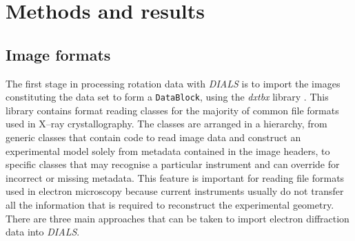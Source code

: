 \documentclass[preprint]{iucr}
\newcommand{\dxtbx}{\emph{dxtbx}\xspace}
\newcommand{\dials}{\emph{DIALS}\xspace}
\newcommand{\code}{\texttt}
\begin{document}
\section{Methods and results}
\subsection{Image formats}

The first stage in processing rotation data with \dials is to import the images
constituting the data set to form a \code{DataBlock}, using the \dxtbx library
\cite{Parkhurst2014}. This library contains format reading classes for the
majority of common file formats used in X--ray crystallography. The classes are
arranged in a hierarchy, from generic classes that contain code to read image
data and construct an experimental model solely from metadata contained in the
image headers, to specific classes that may recognise a particular instrument
and can override for incorrect or missing metadata. This feature is important
for reading file formats used in electron microscopy because current
instruments usually do not transfer all the information that is required to
reconstruct the experimental geometry. There are three main approaches that can
be taken to import electron diffraction data into \dials.
\end{document}
